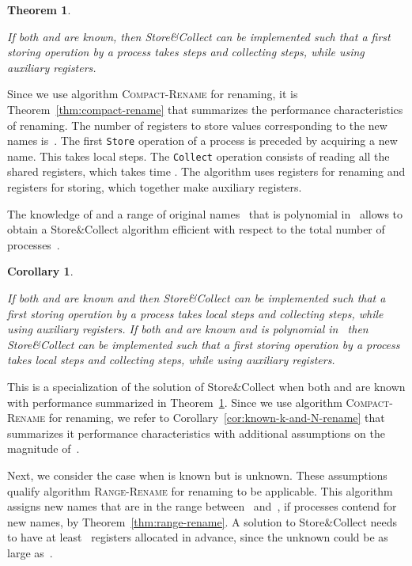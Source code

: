\documentclass[11pt]{article}
\newcommand{\qed}{\hfill  \smallbreak}
\newenvironment{proof}{\noindent{\bf Proof:}}{\qed}
\newtheorem{theorem}{Theorem}
\newtheorem{corollary}{Corollary}
\begin{document}
\begin{theorem}
\label{thm:collect-k-N-both-known}

If both  and  are known, then Store\&Collect can be implemented such that a first storing operation by a process takes   steps and collecting  steps, while using  auxiliary registers.
\end{theorem}

\begin{proof}
Since we use algorithm \textsc{Compact-Rename} for renaming, it is Theorem~\ref{thm:compact-rename} that summarizes the performance characteristics of renaming. 
The number of registers to store values corresponding to the new names is~.
The first \texttt{Store} operation of a process is preceded by acquiring a new name.
This takes   local steps.
The \texttt{Collect} operation consists of reading all the  shared registers, which takes time .
The algorithm uses  registers for renaming and  registers for storing, which together make  auxiliary registers.
\end{proof}


The knowledge of  and a range of original names~ that is polynomial in~ allows to obtain a Store\&Collect algorithm efficient with respect to the total number of processes~.



\begin{corollary}
\label{cor:store-collect-both-k-and-N-known}

If both  and  are known and   then Store\&Collect can be implemented such that a first storing operation by a process takes   local steps  and collecting  steps, while using  auxiliary registers.
If both  and  are known and   is polynomial in~ then Store\&Collect can be implemented such that a first storing operation by a process takes   local steps  and collecting  steps, while using  auxiliary registers.
\end{corollary}

\begin{proof}
This is a specialization of the solution of Store\&Collect when both  and  are known with performance summarized in Theorem~\ref{thm:collect-k-N-both-known}.
Since we use algorithm \textsc{Compact-Rename} for renaming, we refer to Corollary~\ref{cor:known-k-and-N-rename} that summarizes it performance characteristics with additional assumptions on the magnitude of~.
\end{proof}



Next, we consider the case when  is known but  is unknown.
These assumptions qualify algorithm \textsc{Range-Rename} for renaming to be applicable.
This algorithm assigns new names that are in the range between~ and~, if  processes contend for new names, by Theorem~\ref{thm:range-rename}.
A solution to Store\&Collect needs to have at least~ registers allocated in advance, since the unknown  could be as large as~.
\end{document}
